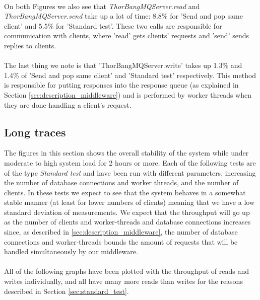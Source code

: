 \documentclass{article}
\begin{document}
            ~\\
            On both Figures we also see that \textit{ThorBangMQServer.read} and \textit{ThorBangMQServer.send} take up a lot of time: 8.8\% for 'Send and pop same client' and 5.5\% for 'Standard test'. These two calls are responsible for communication with clients, where 'read' gets clients' requests and 'send' sends replies to clients.\\
            \\
            The last thing we note is that 'ThorBangMQServer.write' takes up 1.3\% and 1.4\% of 'Send and pop same client' and 'Standard test' respectively. This method is responsible for putting responses into the response queue (as explained in Section \ref{sec:description_middleware}) and is performed by worker threads when they are done handling a client's request.


        \subsection{Long traces}
            The figures in this section shows the overall stability of the system while under moderate to high system load for 2 hours or more. Each of the following tests are of the type \textit{Standard test} and have been run with different parameters, increasing the number of database connections and worker threads, and the number of clients. In these tests we expect to see that the system behaves in a somewhat stable manner (at least for lower numbers of clients) meaning that we have a low standard deviation of measurements. We expect that the throughput will go up as the number of clients and worker-threads and database connections increases since, as described in \ref{sec:description_middleware}, the number of database connections and worker-threads bounds the amount of requests that will be handled simultaneously by our middleware.\\
            \\
            All of the following graphs have been plotted with the throughput of reads and writes individually, and all have many more reads than writes for the reasons described in Section \ref{sec:standard_test}.
            
\end{document}
